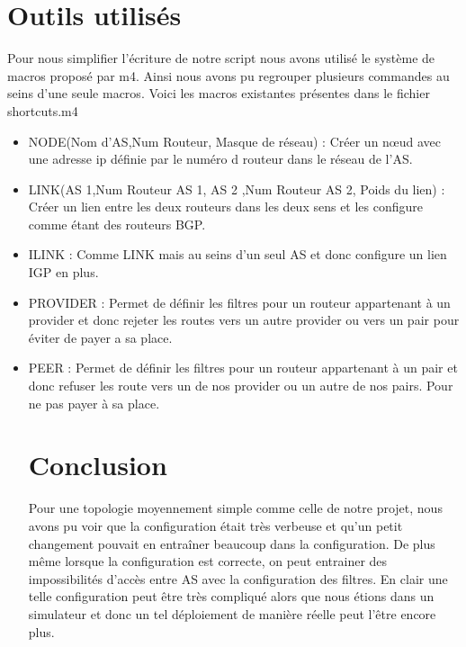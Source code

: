 \documentclass[10pt,a4paper,twocolumn]{article}
\begin{document}
\section{Outils utilisés}
Pour nous simplifier l'écriture de notre script nous avons utilisé le système de macros proposé par m4.
Ainsi nous avons pu regrouper plusieurs commandes au seins d'une seule macros. Voici les macros existantes présentes dans le fichier shortcuts.m4
\begin{itemize}
\item NODE(Nom d'AS,Num Routeur, Masque de réseau) : Créer un nœud avec une adresse ip définie par le numéro d routeur dans le réseau de l'AS.
\item LINK(AS 1,Num Routeur AS 1, AS 2 ,Num Routeur AS 2, Poids du lien) :
Créer un lien entre les deux routeurs dans les deux sens et les configure comme étant des routeurs BGP.
\item ILINK : Comme LINK mais au seins d'un seul AS et donc configure un lien IGP en plus.
\item PROVIDER : Permet de définir les filtres pour un routeur appartenant à un provider et donc rejeter les routes vers un autre provider ou vers un pair pour éviter de payer a sa place.
\item PEER : Permet de définir les filtres pour un routeur appartenant à un pair et donc refuser les route vers un de nos provider ou un autre de nos pairs. Pour ne pas payer à sa place.

\section{Conclusion}

Pour une topologie moyennement simple comme celle de notre projet, nous avons pu voir que la configuration était très verbeuse et qu'un petit changement pouvait en entraîner beaucoup dans la configuration. De plus
même lorsque la configuration est correcte, on peut entrainer des impossibilités d'accès entre AS avec la configuration des filtres.
En clair une telle configuration peut être très compliqué alors que nous étions dans un simulateur et donc un tel déploiement de manière réelle peut l'être encore plus.
\end{itemize}
\end{document}
